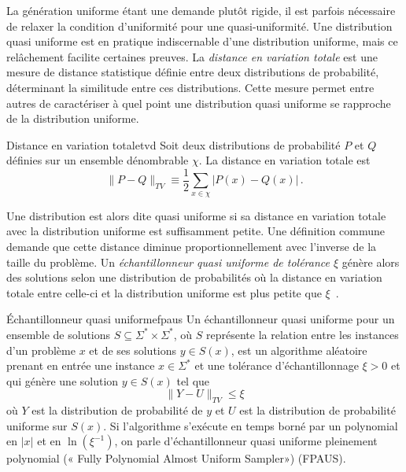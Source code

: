 La génération uniforme étant une demande plutôt rigide, il est parfois nécessaire de relaxer la condition d'uniformité pour une quasi-uniformité. Une distribution quasi uniforme est en pratique indiscernable d'une distribution uniforme, mais ce relâchement facilite certaines preuves. La \textit{distance en variation totale} est une mesure de distance statistique définie entre deux distributions de probabilité, déterminant la similitude entre ces distributions. Cette mesure permet entre autres de caractériser à quel point une distribution quasi uniforme se rapproche de la distribution uniforme.

\begin{subdefinition}{Distance en variation totale}{tvd}
    Soit deux distributions de probabilité $P$ et $Q$ définies sur un ensemble dénombrable $\chi$. La distance en variation totale est
    \begin{equation*}
        \lVert P - Q \rVert_{TV} \equiv \frac{1}{2} \sum_{x \in \chi} \lvert P(x) - Q(x) \rvert \,. 
    \end{equation*}
\end{subdefinition}

Une distribution est alors dite quasi uniforme si sa distance en variation totale avec la distribution uniforme est suffisamment petite. Une définition commune demande que cette distance diminue proportionnellement avec l'inverse de la taille du problème. Un \textit{échantillonneur quasi uniforme de tolérance $\xi$} génère alors des solutions selon une distribution de probabilités où la distance en variation totale entre celle-ci et la distribution uniforme est plus petite que $\xi$~\cite{jerrumCountingSamplingIntegrating2003}.

\begin{maindefinition}{Échantillonneur quasi uniforme}{fpaus}
    Un échantillonneur quasi uniforme pour un ensemble de solutions $S \subseteq \Sigma^{*} \times \Sigma^{*}$, où $S$ représente la relation entre les instances d'un problème $x$ et de ses solutions $y \in  S(x)$, est un algorithme aléatoire prenant en entrée une instance $x \in \Sigma^{*}$ et une tolérance d'échantillonnage $\xi > 0$ et qui génère une solution $y \in S(x)$ tel que
    \begin{equation*}
        \lVert Y - U \rVert_{TV} \leq \xi
    \end{equation*}
    où $Y$ est la distribution de probabilité de $y$ et $U$ est la distribution de probabilité uniforme sur $S(x)$. Si l'algorithme s'exécute en temps borné par un polynomial en $\lvert x \rvert$ et en $\ln (\xi^{-1})$, on parle d'échantillonneur quasi uniforme pleinement polynomial (« Fully Polynomial Almost Uniform Sampler») (FPAUS).
\end{maindefinition}

